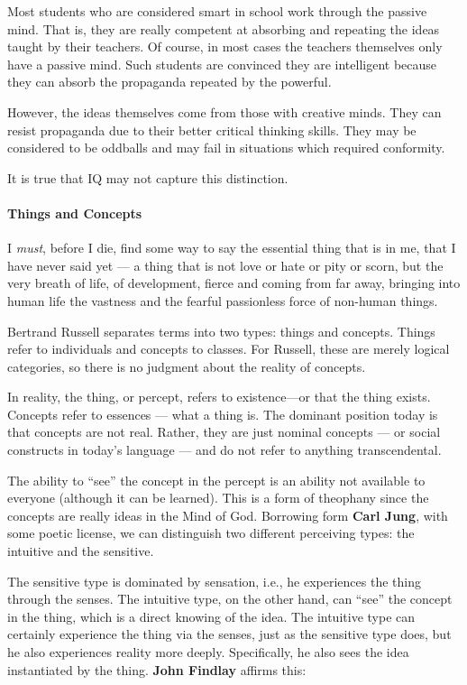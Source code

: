 Most students who are considered smart in school work through the passive mind. That is, they are really competent at absorbing and repeating the ideas taught by their teachers. Of course, in most cases the teachers themselves only have a passive mind. Such students are convinced they are intelligent because they can absorb the propaganda repeated by the powerful.

However, the ideas themselves come from those with creative minds. They can resist propaganda due to their better critical thinking skills. They may be considered to be oddballs and may fail in situations which required conformity.

It is true that IQ may not capture this distinction.

\paragraph{Things and Concepts}


\begin{quotex}
I \emph{must}, before I die, find some way to say the essential thing that is in me, that I have never said yet --- a thing that is not love or hate or pity or scorn, but the very breath of life, of development, fierce and coming from far away, bringing into human life the vastness and the fearful passionless force of non-human things.
\end{quotex}


Bertrand Russell separates terms into two types: things and concepts. Things refer to individuals and concepts to classes. For Russell, these are merely logical categories, so there is no judgment about the reality of concepts.

In reality, the thing, or percept, refers to existence---or that the thing exists. Concepts refer to essences --- what a thing is. The dominant position today is that concepts are not real. Rather, they are just nominal concepts --- or social constructs in today's language --- and do not refer to anything transcendental.

The ability to ``see'' the concept in the percept is an ability not available to everyone (although it can be learned). This is a form of theophany since the concepts are really ideas in the Mind of God. Borrowing form \textbf{Carl Jung}, with some poetic license, we can distinguish two different perceiving types: the intuitive and the sensitive.

The sensitive type is dominated by sensation, i.e., he experiences the thing through the senses. The intuitive type, on the other hand, can ``see'' the concept in the thing, which is a direct knowing of the idea. The intuitive type can certainly experience the thing via the senses, just as the sensitive type does, but he also experiences reality more deeply. Specifically, he also sees the idea instantiated by the thing. \textbf{John Findlay} affirms this:


